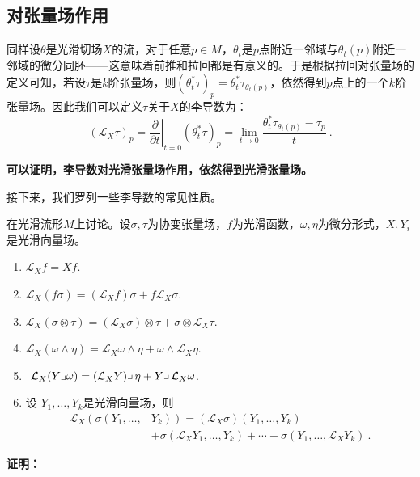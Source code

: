 \subsection{对张量场作用}
同样设$\theta$是光滑切场$X$的流，对于任意$p\in M$，$\theta_t$是$p$点附近一邻域与$\theta_t(p)$附近一邻域的微分同胚——这意味着前推和拉回都是有意义的。于是根据拉回对张量场的定义可知，若设$\tau$是$k$阶张量场，则$(\theta_t^*\tau)_p=\theta_t^*\tau_{\theta_t(p)}$，依然得到$p$点上的一个$k$阶张量场。因此我们可以定义$\tau$关于$X$的李导数为：
\begin{equation}
\left(\mathcal{L}_X \tau\right)_p=\left.\frac{\partial}{\partial t}\right|_{t=0}\left(\theta_t^* \tau\right)_p=\lim _{t \rightarrow 0} \frac{\theta_t^* \tau_{\theta_t(p)}-\tau_p}{t}~.
\end{equation}

\textbf{可以证明，李导数对光滑张量场作用，依然得到光滑张量场。}

接下来，我们罗列一些李导数的常见性质。
\begin{theorem}{}\label{the_lie_1}
在光滑流形$M$上讨论。设$\sigma,\tau$为协变张量场，$f$为光滑函数，$\omega,\eta$为微分形式，$X,Y_i$是光滑向量场。
\begin{enumerate}
\item  $\mathcal{L}_X f=X f$.
\item  $\mathcal{L}_X(f \sigma)=\left(\mathcal{L}_X f\right) \sigma+f \mathcal{L}_X \sigma$.
\item  $\mathcal{L}_X(\sigma \otimes \tau)=\left(\mathcal{L}_X \sigma\right) \otimes \tau+\sigma \otimes \mathcal{L}_X \tau$.
\item  $\mathcal{L}_X(\omega \wedge \eta)=\mathcal{L}_X \omega \wedge \eta+\omega \wedge \mathcal{L}_X \eta$.
\item  $\left.\left.\left.\mathcal{L}_X(Y\lrcorner \omega\right)=\left(\mathcal{L}_X Y\right)\right\lrcorner \eta+Y\right\lrcorner \mathcal{L}_X \omega$.
\item 设 $Y_1, \ldots, Y_k$是光滑向量场，则
\begin{equation}\label{eq_lie_2}
\begin{aligned}
\mathcal{L}_X\left(\sigma \left(Y_1, \ldots,\right.\right. & \left.\left.Y_k\right)\right)=\left(\mathcal{L}_X \sigma\right)\left(Y_1, \ldots, Y_k\right) \\
& +\sigma\left(\mathcal{L}_X Y_1, \ldots, Y_k\right)+\cdots+\sigma\left(Y_1, \ldots, \mathcal{L}_X Y_k\right)~.
\end{aligned}
\end{equation}
\end{enumerate}
\end{theorem}
\textbf{证明：}

